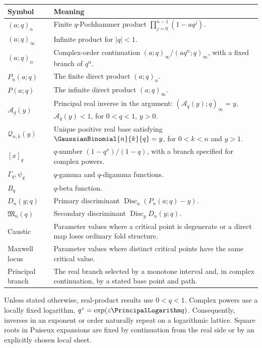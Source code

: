 \documentclass[11pt,oneside]{article}
\theoremstyle{definition}
\theoremstyle{remark}
\theoremstyle{plain}
\theoremstyle{definition}
\theoremstyle{remark}
\newcommand{\Disc}{\operatorname{Disc}}
\newcommand{\Aq}{\mathcal A_q}
\numberwithin{equation}{section}
\numberwithin{figure}{section}
\numberwithin{table}{section}
\providecommand{\backmatter}{}
\begin{document}
\begin{longtable}{@{}p{}p{}@{}}
\toprule
Symbol & Meaning\\
\midrule
\endhead
\((a;q)_n\) & Finite \(q\)-Pochhammer product
\(\prod_{j=0}^{n-1}(1-aq^j)\).\\
\((a;q)_\infty\) & Infinite product for \(|q|<1\).\\
\((a;q)_\alpha\) & Complex-order continuation
\((a;q)_\infty/(aq^\alpha;q)_\infty\), with a fixed branch of \(q^\alpha\).\\
\(P_n(a;q)\) & The finite direct product \((a;q)_n\).\\
\(P(a;q)\) & The infinite direct product \((a;q)_\infty\).\\
\(\Aq(y)\) & Principal real inverse in the argument:
\((\Aq(y);q)_\infty=y\), \(\Aq(y)<1\), for \(0<q<1\), \(y>0\).\\
\(\mathcal Q_{n,k}(y)\) & Unique positive real base satisfying
\(\GaussianBinomial{n}{k}{q}=y\), for \(0<k<n\) and \(y>1\).\\
\([x]_q\) & \(q\)-number \((1-q^x)/(1-q)\), with a branch specified for
complex powers.\\
\(\Gamma_q,\psi_q\) & \(q\)-gamma and \(q\)-digamma functions.\\
\(B_q\) & \(q\)-beta function.\\
\(D_n(y;q)\) & Primary discriminant \(\Disc_a(P_n(a;q)-y)\).\\
\(\mathfrak M_n(q)\) & Secondary discriminant \(\Disc_yD_n(y;q)\).\\
Caustic & Parameter values where a critical point is degenerate or a direct
map loses ordinary fold structure.\\
Maxwell locus & Parameter values where distinct critical points have the same
critical value.\\
Principal branch & The real branch selected by a monotone interval and, in
complex continuation, by a stated base point and path.\\
\bottomrule
\end{longtable}

Unless stated otherwise, real-product results use \(0<q<1\).  Complex powers
use a locally fixed logarithm, \(q^z=\exp(z\PrincipalLogarithm q)\).  Consequently, inverses
in an exponent or order naturally repeat on a logarithmic lattice.  Square
roots in Puiseux expansions are fixed by continuation from the real side or by
an explicitly chosen local sheet.

\backmatter
\end{document}

